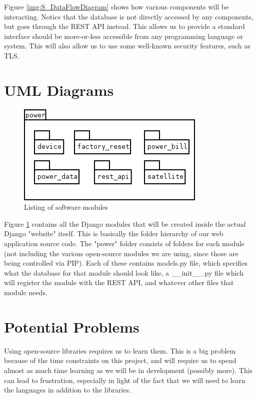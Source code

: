 Figure \ref{img:S_DataFlowDiagram} shows how various components will be interacting. Notice that the database is not directly accessed by any components, but goes through the REST API instead. This allows us to provide a standard interface should be more-or-less accessible from any programming language or system. This will also allow us to use some well-known security features, such as TLS.

\section{UML Diagrams}

\begin{figure}[H]
\centering
\includegraphics[scale=0.75]{Software/images/Power-Package-Listing.png}
\caption{Listing of software modules}
\label{img:S_PackageListing}
\end{figure}

Figure \ref{img:S_PackageListing} contains all the Django modules that will be created inside the actual Django "website" itself. This is basically the folder hierarchy of our web application source code. The "power" folder consists of folders for each module (not including the various open-source modules we are using, since those are being controlled via PIP). Each of these contains models.py file, which specifies what the database for that module should look like, a \_\_init\_\_.py file which will register the module with the REST API, and whatever other files that module needs. 

\section{Potential Problems}

Using open-source libraries requires us to learn them. This is a big problem because of the time constraints on this project, and will require us to spend almost as much time learning as we will be in development (possibly more). This can lead to frustration, especially in light of the fact that we will need to learn the languages in addition to the libraries.

